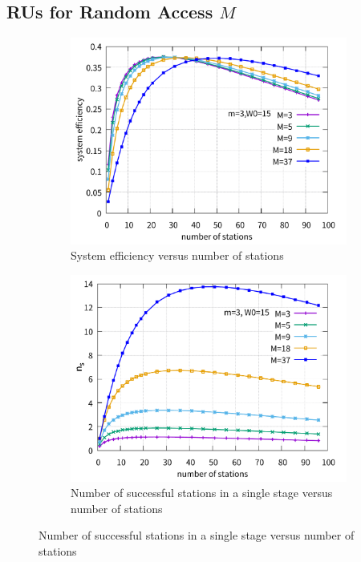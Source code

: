 \documentclass[journal]{IEEEtran}
\begin{document}
\subsection{RUs for Random Access $M$}
\label{M}
\begin{figure}[!t]
\begin{subfigure}{0.5\textwidth}
\includegraphics[scale=.38]{./figure/Section_perf_eval/M/n_M_eff_perf.pdf}
\caption{System efficiency versus number of stations}
\label{fig_n_M_eff}
\end{subfigure}

\begin{subfigure}{0.5\textwidth}  
\includegraphics[scale=.38]{./figure/Section_perf_eval/M/n_M_ns_perf.pdf}
\caption{Number of successful stations in a single stage versus number of stations}
\label{fig_n_M_ns}
\end{subfigure}


\end{figure}
\end{document}
